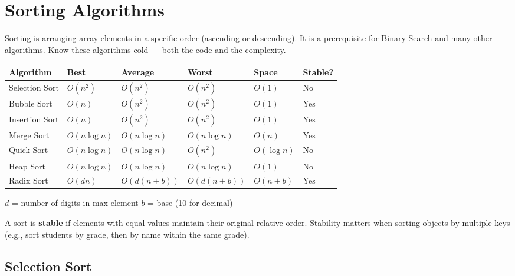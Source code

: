 \documentclass[12pt,a4paper,oneside]{book}
\begin{document}
\chapter{Sorting Algorithms}

Sorting is arranging array elements in a specific order (ascending or descending). It is a prerequisite for Binary Search and many other algorithms. Know these algorithms cold --- both the code and the complexity.

\begin{center}
\begin{tabular}{llllll}
\toprule
\textbf{Algorithm} & \textbf{Best} & \textbf{Average} & \textbf{Worst} & \textbf{Space} & \textbf{Stable?}\\
\midrule
Selection Sort & $O(n^2)$      & $O(n^2)$      & $O(n^2)$      & $O(1)$ & No\\
Bubble Sort    & $O(n)$        & $O(n^2)$      & $O(n^2)$      & $O(1)$ & Yes\\
Insertion Sort & $O(n)$        & $O(n^2)$      & $O(n^2)$      & $O(1)$ & Yes\\
Merge Sort     & $O(n\log n)$  & $O(n\log n)$  & $O(n\log n)$  & $O(n)$ & Yes\\
Quick Sort     & $O(n\log n)$  & $O(n\log n)$  & $O(n^2)$      & $O(\log n)$ & No\\
Heap Sort      & $O(n\log n)$  & $O(n\log n)$  & $O(n\log n)$  & $O(1)$ & No\\
Radix Sort     & $O(dn)$       & $O(d(n+b))$   & $O(d(n+b))$   & $O(n+b)$ & Yes\\
\bottomrule
\end{tabular}
\end{center}

{\small\color{mygray}$d$ = number of digits in max element \quad $b$ = base (10 for decimal)}

\begin{tipbox}
A sort is \textbf{stable} if elements with equal values maintain their original relative order. Stability matters when sorting objects by multiple keys (e.g., sort students by grade, then by name within the same grade).
\end{tipbox}

\section{Selection Sort}
\end{document}

